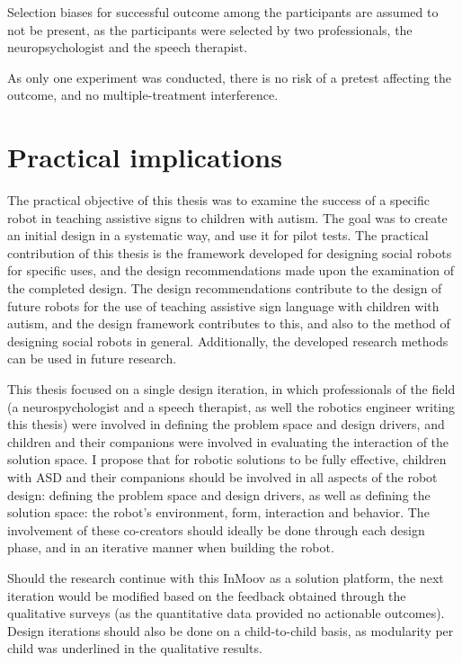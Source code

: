 Selection biases for successful outcome among the participants are assumed to not be present, as the participants were selected by two professionals, the neuropsychologist and the speech therapist.

As only one experiment was conducted, there is no risk of a pretest affecting the outcome, and no multiple-treatment interference.


\section{Practical implications}

The practical objective of this thesis was to examine the success of a specific robot in teaching assistive signs to children with autism. The goal was to create an initial design in a systematic way, and use it for pilot tests. The practical contribution of this thesis is the framework developed for designing social robots for specific uses, and the design recommendations made upon the examination of the completed design. The design recommendations contribute to the design of future robots for the use of teaching assistive sign language with children with autism, and the design framework contributes to this, and also to the method of designing social robots in general. Additionally, the developed research methods can be used in future research.

This thesis focused on a single design iteration, in which professionals of the field (a neurospychologist and a speech therapist, as well the robotics engineer writing this thesis) were involved in defining the problem space and design drivers, and children and their companions were involved in evaluating the interaction of the solution space. I propose that for robotic solutions to be fully effective, children with ASD and their companions should be involved in all aspects of the robot design: defining the problem space and design drivers, as well as defining the solution space: the robot's environment, form, interaction and behavior. The involvement of these co-creators should ideally be done through each design phase, and in an iterative manner when building the robot.

Should the research continue with this InMoov as a solution platform, the next iteration would be modified based on the feedback obtained through the qualitative surveys (as the quantitative data provided no actionable outcomes). Design iterations should also be done on a child-to-child basis, as modularity per child was underlined in the qualitative results.

